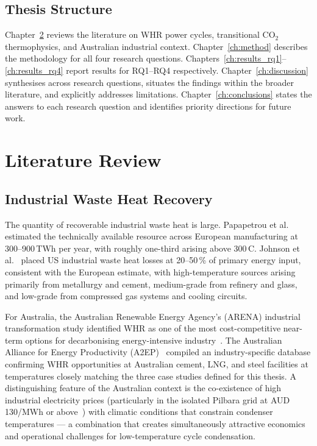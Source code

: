 \section{Thesis Structure}
\label{sec:structure}

Chapter~\ref{ch:litreview} reviews the literature on WHR power cycles,
transitional CO$_2$ thermophysics, and Australian industrial context.
Chapter~\ref{ch:method} describes the methodology for all four research
questions. Chapters~\ref{ch:results_rq1}--\ref{ch:results_rq4} report
results for RQ1--RQ4 respectively. Chapter~\ref{ch:discussion} synthesises
across research questions, situates the findings within the broader literature,
and explicitly addresses limitations. Chapter~\ref{ch:conclusions} states the
answers to each research question and identifies priority directions for future
work.

\chapter{Literature Review}
\label{ch:litreview}

\section{Industrial Waste Heat Recovery}
\label{sec:lit_whr}

The quantity of recoverable industrial waste heat is large. Papapetrou et
al.~\cite{Papapetrou2018} estimated the technically available resource across
European manufacturing at 300--900\,TWh per year, with roughly one-third
arising above 300\,\textdegree C. Johnson et al.~\cite{Johnson2008} placed US
industrial waste heat losses at 20--50\,\% of primary energy input, consistent
with the European estimate, with high-temperature sources arising primarily
from metallurgy and cement, medium-grade from refinery and glass, and
low-grade from compressed gas systems and cooling circuits.

For Australia, the Australian Renewable Energy Agency's (ARENA) industrial
transformation study identified WHR as one of the most cost-competitive
near-term options for decarbonising energy-intensive industry~\cite{ARENA2023}.
The Australian Alliance for Energy Productivity (A2EP)~\cite{A2EP2022}
compiled an industry-specific database confirming WHR opportunities at
Australian cement, LNG, and steel facilities at temperatures closely matching
the three case studies defined for this thesis. A distinguishing feature of
the Australian context is the co-existence of high industrial electricity
prices (particularly in the isolated Pilbara grid at AUD\,130/MWh or
above~\cite{AEMO2024}) with climatic conditions that constrain condenser
temperatures --- a combination that creates simultaneously attractive economics
and operational challenges for low-temperature cycle condensation.

